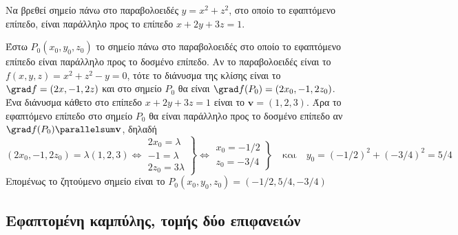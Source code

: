 \begin{mybox3}
\begin{example}
  Να βρεθεί σημείο πάνω στο παραβολοειδές $ y=x^{2}+z^{2} $, στο οποίο το εφαπτόμενο 
  επίπεδο, είναι παράλληλο προς το επίπεδο $ x+2y+3z=1 $.
\end{example}
\end{mybox3}
\begin{solution}
  Έστω $ P_{0}(x_{0}, y_{0}, z_{0}) $ το σημείο πάνω στο παραβολοειδές στο οποίο το 
  εφαπτόμενο επίπεδο είναι παράλληλο προς το δοσμένο επίπεδο. Αν το παραβολοειδές 
  είναι το $ f(x,y,z)=x^{2}+z^{2}-y=0 $, τότε το διάνυσμα της κλίσης είναι το
  $ \grad f = (2x,-1,2z) $ και στο σημείο $ P_{0} $ θα είναι $ \grad f(P_{0}) = (2
  x_{0},-1, 2 z_{0}) $. Ένα διάνυσμα κάθετο στο επίπεδο $ x+2y+3z=1 $ είναι το 
  $ \mathbf{v}=(1,2,3) $. Άρα το εφαπτόμενο επίπεδο στο σημείο $ P_{0} $ θα είναι 
  παράλληλο προς το δοσμένο επίπεδο αν $\grad f(P_{0})  \parallelsum \mathbf{v} $, 
  δηλαδή 
  \[
    (2 x_{0}, -1, 2 z_{0}) = \lambda (1,2,3) \Leftrightarrow 
  \left.
      \begin{matrix}
    2 x_{0} = \lambda \\
    -1= \lambda \\ 
    2 z_{0}= 3 \lambda
  \end{matrix} 
\right\} \Leftrightarrow 
\left.
  \begin{matrix}
    x_{0}=-1/2 \\
    z_{0}=-3/4
\end{matrix} 
\right\} \quad \text{και} \quad y_{0}=(-1/2)^{2}+(-3/4)^{2} = 5/4
  \] 
  Επομένως το ζητούμενο σημείο είναι το $ P_{0}(x_{0}, y_{0}, z_{0}) = (-1/2,5/4,-3/4) $

\end{solution}

\subsection*{Εφαπτομένη καμπύλης, τομής δύο επιφανειών}

